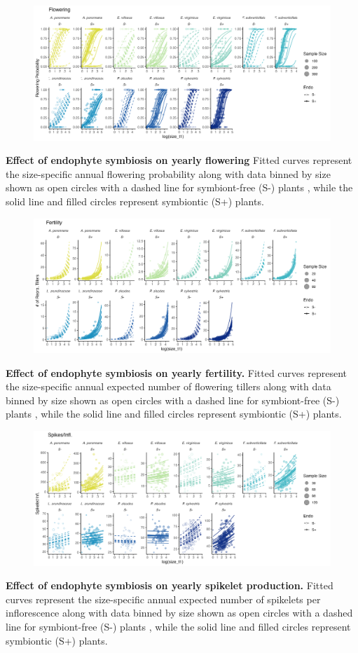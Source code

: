 \documentclass[12pt]{article}
\begin{document}
\begin{figure}[H]
	\centering
	\includegraphics[width=.8\linewidth]{flw_yearplot.png}
\end{figure}
 \textbf{Effect of endophyte symbiosis on yearly flowering} Fitted curves represent the size-specific annual flowering probability along with data binned by size shown as open circles with a dashed line for symbiont-free (S-) plants , while the solid line and filled circles represent symbiontic (S+) plants.
\begin{figure}[H]
	\centering
	\includegraphics[width=.8\linewidth]{fert_yearplot.png}
\end{figure}
 \textbf{Effect of endophyte symbiosis on yearly fertility.} Fitted curves represent the size-specific annual expected number of flowering tillers along with data binned by size shown as open circles with a dashed line for symbiont-free (S-) plants , while the solid line and filled circles represent symbiontic (S+) plants. 
\newpage
\begin{figure}[H]
	\centering
	\includegraphics[width=.8\linewidth]{spike_yearplot.png}
\end{figure}
 \textbf{Effect of endophyte symbiosis on yearly spikelet production.} Fitted curves represent the size-specific annual expected number of spikelets per inflorescence along with data binned by size shown as open circles with a dashed line for symbiont-free (S-) plants , while the solid line and filled circles represent symbiontic (S+) plants.
\newpage
\end{document}
